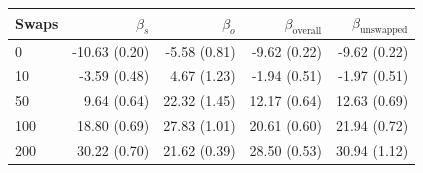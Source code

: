 \begin{table}[H]
\begin{tabular}{l rrrr}
\toprule
Swaps & $\beta_s$ & $\beta_o$ & $\beta_{\mathrm{overall}}$ & $\beta_{\mathrm{unswapped}}$ \\
\midrule
0 & -10.63 (0.20) & -5.58 (0.81) & -9.62 (0.22) & -9.62 (0.22) \\
10 & -3.59 (0.48) & 4.67 (1.23) & -1.94 (0.51) & -1.97 (0.51) \\
50 & 9.64 (0.64) & 22.32 (1.45) & 12.17 (0.64) & 12.63 (0.69) \\
100 & 18.80 (0.69) & 27.83 (1.01) & 20.61 (0.60) & 21.94 (0.72) \\
200 & 30.22 (0.70) & 21.62 (0.39) & 28.50 (0.53) & 30.94 (1.12) \\
\bottomrule
\end{tabular}
\end{table}

